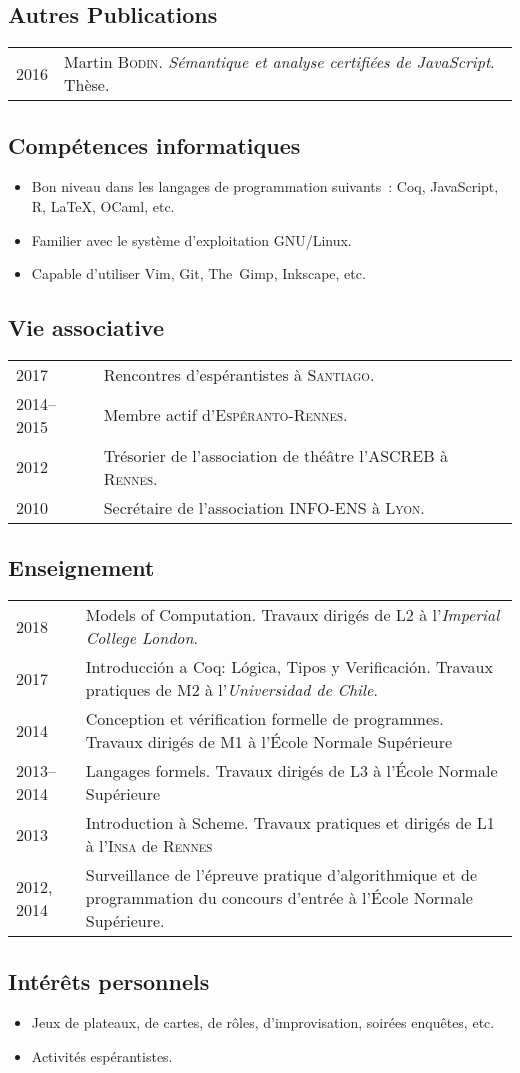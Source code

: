 \documentclass[12pt,a4paper]{article}
\makeatletter
\newcommand{\en}[1]{\foreignlanguage{english}{\textit{#1}}}
\newcommand{\es}[1]{\foreignlanguage{spanish}{\textit{#1}}}
\newcommand{\en}[1]{\foreignlanguage{english}{\textit{#1}}}
\newenvironment{datecvsection}[1]%
               {\subsection*{#1}%
                 \noindent \begin{tabular}{@{}p{\annee}p{\texte}@{}}}
               {\end{tabular}}
\newenvironment{itemcvsection}[1]%
               {\subsection*{#1}\begin{itemize}}
               {\end{itemize}}
\makeatother
\begin{document}
\begin{datecvsection}{Autres Publications}

    2016 & Martin \textsc{Bodin}. \textit{Sémantique et analyse certifiées de JavaScript}. Thèse. \\

\end{datecvsection}

\begin{itemcvsection}{Compétences informatiques}

  \item Bon niveau dans les langages de programmation suivants~:  Coq, JavaScript, R, \LaTeX, OCaml, etc.
  \item Familier avec le système d’exploitation GNU/Linux.
  \item Capable d’utiliser Vim, Git, The~Gimp, Inkscape, etc.

\end{itemcvsection}

\begin{datecvsection}{Vie associative}

    2017 & Rencontres d’espérantistes à \textsc{Santiago}. \\
    2014–2015 & Membre actif d’\textsc{Espéranto-Rennes}. \\
	2012 & Trésorier de l’association de théâtre l’\textsc{ASCREB} à \textsc{Rennes}. \\
	2010 & Secrétaire de l’association \textsc{INFO-ENS} à \textsc{Lyon}. \\

\end{datecvsection}

\begin{datecvsection}{Enseignement}

    2018 & Models of Computation. Travaux dirigés de L2 à l’\en{Imperial College London}. \\

    2017 & Introducción a Coq: Lógica, Tipos y Verificación. Travaux pratiques de M2 à l’\es{Universidad de Chile}. \\

    2014 & Conception et vérification formelle de programmes. Travaux dirigés de M1 à l’École Normale Supérieure \\

    2013–2014 & Langages formels. Travaux dirigés de L3 à l’École Normale Supérieure \\

    2013 & Introduction à Scheme. Travaux pratiques et dirigés de L1 à l’\textsc{Insa} de \textsc{Rennes} \\

	2012, 2014 & Surveillance de l’épreuve pratique d’algorithmique et de programmation du concours d’entrée à l’École Normale Supérieure.

\end{datecvsection}

\begin{itemcvsection}{Intérêts personnels}

  \item Jeux de plateaux, de cartes, de rôles, d’improvisation, soirées enquêtes, etc.
  \item Activités espérantistes.

\end{itemcvsection}
\end{document}
